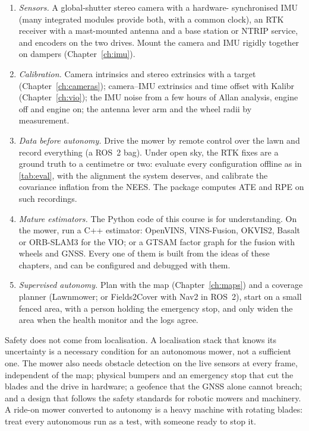 \begin{enumerate}
\item \emph{Sensors.} A global-shutter stereo camera with a hardware-
  synchronised IMU (many integrated modules provide both, with a common
  clock), an RTK receiver with a mast-mounted antenna and a base station
  or NTRIP service, and encoders on the two drives. Mount the camera and
  IMU rigidly together on dampers (Chapter~\ref{ch:imu}).
\item \emph{Calibration.} Camera intrinsics and stereo extrinsics with a
  target (Chapter~\ref{ch:cameras}); camera--IMU extrinsics and time
  offset with Kalibr (Chapter~\ref{ch:vio}); the IMU noise from a few
  hours of Allan analysis, engine off and engine on; the antenna lever
  arm and the wheel radii by measurement.
\item \emph{Data before autonomy.} Drive the mower by remote control
  over the lawn and record everything (a ROS~2 bag). Under open sky, the
  RTK fixes are a ground truth to a centimetre or two: evaluate every
  configuration offline as in \cref{tab:eval}, with the alignment the
  system deserves, and calibrate the covariance inflation from the NEES.
  The  package computes ATE and RPE on such recordings.
\item \emph{Mature estimators.} The Python code of this course is for
  understanding. On the mower, run a C++ estimator: OpenVINS, VINS-Fusion,
  OKVIS2, Basalt or ORB-SLAM3 for the VIO;  or
  a GTSAM factor graph for the fusion with wheels and GNSS. Every one of
  them is built from the ideas of these chapters, and can be configured
  and debugged with them.
\item \emph{Supervised autonomy.} Plan with the map (Chapter~\ref{ch:maps})
  and a coverage planner (Lawnmower; or Fields2Cover with Nav2 in ROS~2),
  start on a small fenced area, with a person holding the emergency stop,
  and only widen the area when the health monitor and the logs agree.
\end{enumerate}

\begin{mower}
Safety does not come from localisation. A localisation stack that knows
its uncertainty is a necessary condition for an autonomous mower, not a
sufficient one. The mower also needs obstacle detection on the live
sensors at every frame, independent of the map; physical bumpers and an
emergency stop that cut the blades and the drive in hardware; a geofence
that the GNSS alone cannot breach; and a design that follows the safety
standards for robotic mowers and machinery. A ride-on mower converted to
autonomy is a heavy machine with rotating blades: treat every
autonomous run as a test, with someone ready to stop it.
\end{mower}

